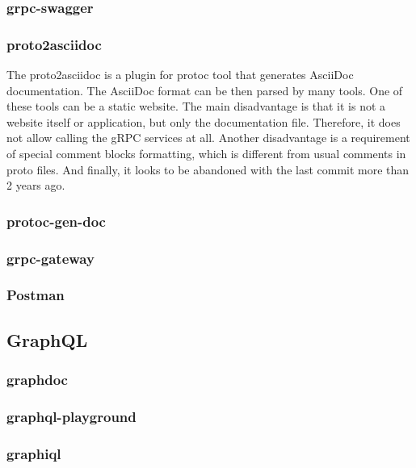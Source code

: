 \subsubsection{grpc-swagger}

\subsubsection{proto2asciidoc}
The proto2asciidoc is a plugin for protoc tool that generates AsciiDoc documentation.
The AsciiDoc format can be then parsed by many tools.
One of these tools can be a static website.
The main disadvantage is that it is not a website itself or application, but only the documentation file.
Therefore, it does not allow calling the gRPC services at all.
Another disadvantage is a requirement of special comment blocks formatting, which is different from usual comments in proto files.
And finally, it looks to be abandoned with the last commit more than 2 years ago.
\cite{grpc-proto2asciidoc}

\subsubsection{protoc-gen-doc}
\cite{grpc-protoc-gen-doc}

\subsubsection{grpc-gateway}

\subsubsection{Postman}

\subsection{GraphQL}

\subsubsection{graphdoc}

\subsubsection{graphql-playground}

\subsubsection{graphiql}

